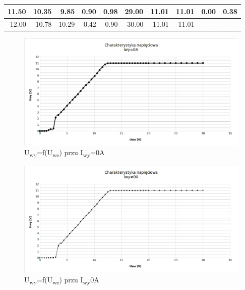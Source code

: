 \documentclass[a4paper,12pt]{article}
\begin{document}
\begin{table}[h]
{\begin{tabular}{|r|r|r|r|r|r|r|r|r|r|}
11.50                       & 10.35                       & 9.85                        & 0.90                        & 0.98
& 29.00                     & 11.01                       & 11.01                       & 0.00                        & 0.38\\ \hline
12.00                       & 10.78                       & 10.29                       & 0.42                        & 0.90
& 30.00                     & 11.01                       & 11.01
& \multicolumn{1}{c|}{-}    & \multicolumn{1}{c|}{-}      \\ \hline
\end{tabular}
}
\end{table}

\pagebreak
\begin{figure}[h!]
  \center 
  \includegraphics[width=1\textwidth]{charak-napieciowa1}
  \caption{U\textsubscript{wy}=f(U\textsubscript{we}) przu I\textsubscript{wy}=0A}
\end{figure}

\begin{figure}[h!]
  \center
  \includegraphics[width=1\textwidth]{charak-napieciowa2}
  \caption{ U\textsubscript{wy}=f(U\textsubscript{we}) przu I\textsubscript{wy}\neq0A}
\end{figure}
\end{document}

